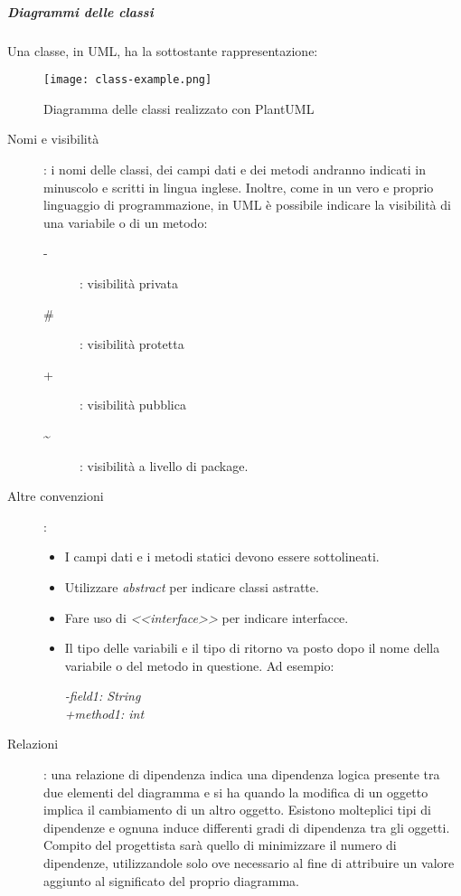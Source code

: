 \documentclass[../../norme-di-progetto.tex]{subfiles}
\begin{document}
\subparagraph{Diagrammi delle classi}%
\label{subp:diagrammi_delle_classi}
Una classe, in UML, ha la sottostante rappresentazione:
\begin{figure}[H]%
  \label{fig:classe_uml}
  \texttt{[image: class-example.png]}
  \centering
  \caption{Diagramma delle classi realizzato con PlantUML}
\end{figure}
\begin{description}
  \item [Nomi e visibilità]: i nomi delle classi, dei campi dati e dei metodi andranno indicati in minuscolo e scritti in lingua inglese.
        Inoltre, come in un vero e proprio linguaggio di programmazione, in UML è possibile indicare la visibilità di una variabile o di un metodo:
        \begin{description}
          \item [-]: visibilità privata
          \item [\#]: visibilità protetta
          \item [+]: visibilità pubblica
          \item [\textasciitilde]: visibilità a livello di package.
        \end{description}
  \item[Altre convenzioni]:
        \begin{itemize}
          \item I campi dati e i metodi statici devono essere sottolineati.
          \item Utilizzare \textit{{abstract}} per indicare classi astratte.
          \item Fare uso di \textit{<<interface>>} per indicare interfacce.
          \item Il tipo delle variabili e il tipo di ritorno va posto dopo il nome della variabile o del metodo in questione. Ad esempio:
                \begin{center}
                  \textit{-field1: String} \\\textit{+method1: int}
                \end{center}
        \end{itemize}
  \item [Relazioni]: una relazione di dipendenza indica una dipendenza logica presente tra due elementi del diagramma e si ha quando la modifica di un oggetto implica il cambiamento di un altro oggetto.
        Esistono molteplici tipi di dipendenze e ognuna induce differenti gradi di dipendenza tra gli oggetti.
        Compito del progettista sarà quello di minimizzare il numero di dipendenze, utilizzandole solo ove necessario al fine di attribuire un valore aggiunto al significato del proprio diagramma.

\end{description}
\end{document}
